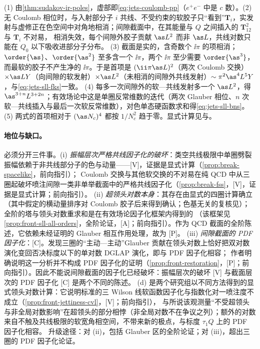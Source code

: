 \begin{proofsketch}
(1) 由\cref{thm:sudakov-ir-poles}，虚部即\cref{eq:jets-coulomb-pp}（$e^+e^-$ 中是 $c$ 数）。(2) 无 Coulomb 相位时，与入射部分子 $i$ 共线、不受约束的软胶子只“看到”$\bm T_i$，实发射与虚修正在色空间中对角地相消；间隙截面中，在其能量与 $Q$ 之间插入的 $\bm T_{12}^2$ 与 $\bm T_i$ 不对易，
相消失效，每个间隙外胶子贡献 $\as L^2$ 而非 $\as L$，共线对数只能在 $Q_0$ 以下吸收进部分子分布\cite{ForshawKyrieleisSeymour2006}。
(3) 截面是实的，含奇数个 $\ii\pi$ 的项相消；$\order{\as}$、$\order{\as^2}$ 至多含一个 $\ii\pi$，两个 $\ii\pi$ 至少需要 $\order{\as^3}$，而最软的胶子不产生净的 $\ii\pi$\cite{ForshawKyrieleisSeymour2006}。于是首项是 $(\ii\pi\as L)^2$（两次 Coulomb 交换）$\times\as LY$（向间隙的软发射）$\times\as L^2$（未相消的间隙外共线发射）$\sim\pi^2\as^4L^5Y$，与\cref{eq:jets-sll-fks}一致。
(4) 每多一次间隙外的软—共线发射多一个 $\as L^2$，得 $\as^{3+n}L^{3+2n}$；有效场论中这是单圈反常维数的迭代（两次 Glauber 相位、$n$ 次软—共线插入与最后一次软反常维数\cite{Becher:2021zkk}），对色单态硬函数求和得\cref{eq:jets-sll-bns}。
(5) 两式的首项相对于 $(\as N_c)^4$ 都按 $1/N_c^2$ 趋于零。显式计算见\cite[第~3~节]{ForshawKyrieleisSeymour2006}与\cite{Forshaw:2008cq}。
\end{proofsketch}

\paragraph{地位与缺口。}
必须分开三件事。(i) \emph{振幅层次严格共线因子化的破坏}：类空共线极限中单圈劈裂振幅依赖于非共线部分子的色与动量——[V]，证据是显式计算（\cref{prop:break-spacelike}，前向指引）；
Coulomb 交换与其他软交换的不对易在纯 QCD 中从三圈起破坏喷注间隙一类非单举截面中的严格共线因子化（\cref{prop:break-fss}，[V]，证据是显式计算；前向指引）。
(ii) \emph{超领头对数本身}：其存在由显式的四圈计算确立\cite{ForshawKyrieleisSeymour2006}（其中假定的横动量排序对 Coulomb 胶子后来得到确认\cite{Angeles-Martinez:2015rna}；色基无关的复核见\cite{Forshaw:2008cq}）；全阶的塔与领头对数重求和是在有效场论因子化框架内得到的
\cite{Becher:2021zkk,Becher:2023mtx,Boer:2024hzh,Becher:2024nqc}（该框架见\cref{prop:front-sll-all-orders}，全阶论证，[A]；前向指引）。作为 QCD 截面的全阶陈述，它依赖未经证明的 Glauber 相互作用处理，故为 [P]。
(iii) \emph{间隙截面的 PDF 因子化}：[C]。\cite{Becher:2024kmk}发现三圈的“主动—主动”Glauber 贡献在领头对数上恰好把双对数演化变回否决标度以下的单对数 DGLAP 演化，即与 PDF 因子化相容；
作者明确说明这一分析并不构成 PDF 因子化的证明（\cref{prop:front-restoration}，[P]；前向指引）。因此不能说间隙截面的因子化已经破坏：振幅层次的破坏 [V] 与截面层次的 PDF 因子化 [C] 是两个不同的陈述。
(d) 是两个研究组以不同方法得到的显式领头对数计算\cite{Banfi:2025mra,Becher:2026kbr}：它说明标准的三 Wilson 线软函数因子化与指数化对一喷注度不成立（\cref{prop:front-jettiness-cvl}，[V]；前向指引），
与\cite{Alioli:2023rxx}所说该观测量“不受超领头与非全局对数影响”在超领头的部分相悖（非全局对数不在争议之列）；额外的对数来自不触及共线极限的软宽角相空间，不带来新的极点，与标度 $\tau_1Q$ 上的 PDF 因子化相容\cite{Banfi:2025mra}。
升级途径：对 (ii)，包括 Glauber 区的全阶论证；对 (iii)，超出三圈的 PDF 因子化论证。
